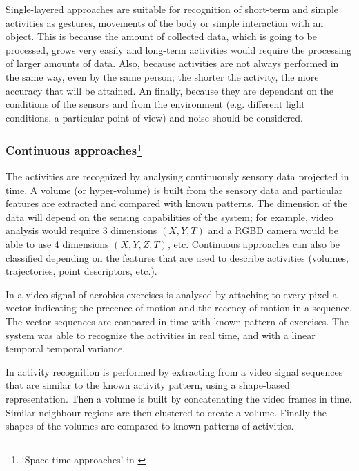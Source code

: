 \documentclass[a4paper, 12pt, openany, oneside]{book}
\begin{document}
Single-layered approaches are suitable for recognition of short-term and simple activities as gestures, movements of the body or simple interaction with an object. 
This is because the amount of collected data, which is going to be processed, grows very easily and long-term activities would require the processing of larger amounts of data. 
Also, because activities are not always performed in the same way, even by the same person; the shorter the activity, the more accuracy that will be attained.  
An finally, because they are dependant on the conditions of the sensors and from the environment (e.g. different light conditions, a particular point of view) and noise should be considered.


\subsubsection{Continuous approaches\footnote{`Space-time approaches' in \citep{Aggarwal11_HumanActivity}}} %

The activities are recognized by analysing continuously sensory data projected in time. 
A volume (or hyper-volume) is built from the sensory data and particular features are extracted and compared with known patterns.
The dimension of the data will depend on the sensing capabilities of the system; for example, video analysis would require 3 dimensions $(X,Y,T)$ and a RGBD camera would be able to use 4 dimensions $(X,Y,Z,T)$, etc. %
Continuous approaches can also be classified depending on the features that are used to describe activities (volumes, trajectories, point descriptors, etc.).

In \citep{Bobick2001_RecHuMovTemp} a video signal of aerobics exercises is analysed by attaching to every pixel a vector indicating the precence of motion and the recency of motion in a sequence. 
The vector sequences are compared in time with known pattern of exercises. 
The system was able to recognize the activities in real time, and with a linear temporal temporal variance. 

In \citep{Ke2007_SpTmpShapeAR} activity recognition is performed by extracting from a video signal sequences that are similar to the known activity pattern, using a shape-based representation. 
Then a volume is built by concatenating the video frames in time. Similar neighbour regions are then clustered to create a volume. 
Finally the shapes of the volumes are compared to known patterns of activities.
\end{document}
